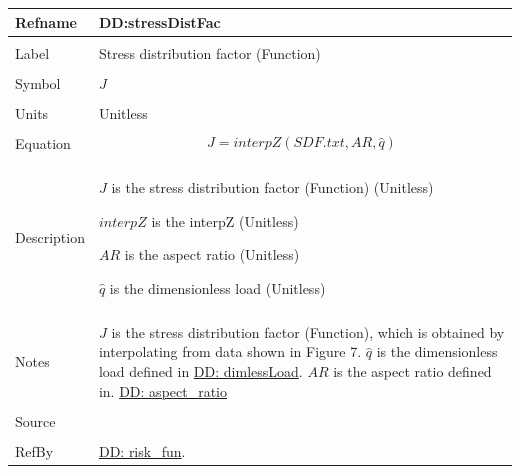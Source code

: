 \documentclass[12pt]{article}
\begin{document}
\noindent \begin{minipage}{\textwidth}
\begin{tabular}{p{} p{}}
\toprule \textbf{Refname} & \textbf{DD:stressDistFac}
\label{DD:stressDistFac}
\\ \midrule \\
Label & Stress distribution factor (Function)
\\ \midrule \\
Symbol & $J$
\\ \midrule \\
Units & Unitless
\\ \midrule \\
Equation & \begin{displaymath}
           J=interpZ\left(SDF.txt,AR,\hat{q}\right)
           \end{displaymath}
\\ \midrule \\
Description & \begin{symbDescription}
              \item{$J$ is the stress distribution factor (Function) (Unitless)}
              \item{$interpZ$ is the interpZ (Unitless)}
              \item{$AR$ is the aspect ratio (Unitless)}
              \item{$\hat{q}$ is the dimensionless load (Unitless)}
              \end{symbDescription}
\\ \midrule \\
Notes & $J$ is the stress distribution factor (Function), which is obtained by interpolating from data shown in Figure 7.
        $\hat{q}$ is the dimensionless load defined in \hyperref[DD:dimlessLoad]{DD: dimlessLoad}.
        $AR$ is the aspect ratio defined in. \hyperref[DD:aspect.ratio]{DD: aspect\_ratio}
\\ \midrule \\
Source & \cite{astm2009}
\\ \midrule \\
RefBy & \hyperref[DD:risk.fun]{DD: risk\_fun}.
\\ \bottomrule \end{tabular}
\end{minipage}
\par~
\end{document}
